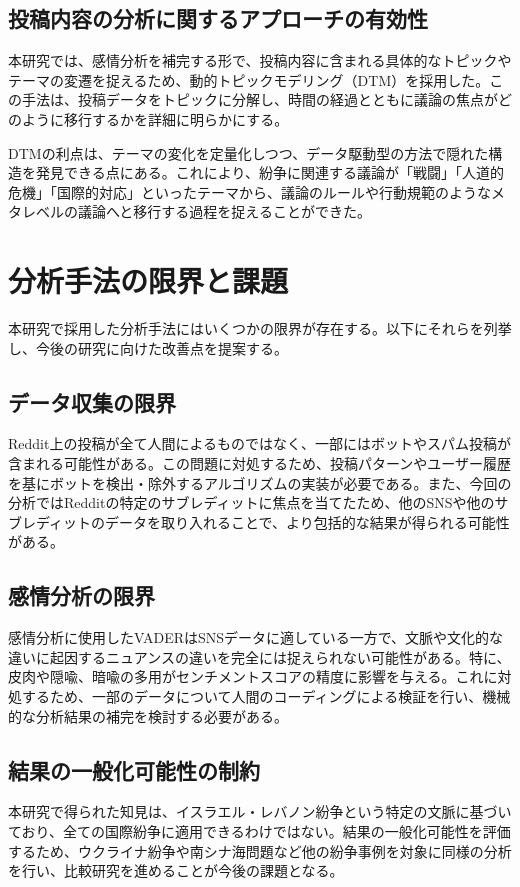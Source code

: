 \documentclass[11pt, a4j]{jreport}
\begin{document}
    \subsection{投稿内容の分析に関するアプローチの有効性}
    本研究では、感情分析を補完する形で、投稿内容に含まれる具体的なトピックやテーマの変遷を捉えるため、動的トピックモデリング（DTM）を採用した。この手法は、投稿データをトピックに分解し、時間の経過とともに議論の焦点がどのように移行するかを詳細に明らかにする。

    DTMの利点は、テーマの変化を定量化しつつ、データ駆動型の方法で隠れた構造を発見できる点にある。これにより、紛争に関連する議論が「戦闘」「人道的危機」「国際的対応」といったテーマから、議論のルールや行動規範のようなメタレベルの議論へと移行する過程を捉えることができた。

    \section{分析手法の限界と課題}
    本研究で採用した分析手法にはいくつかの限界が存在する。以下にそれらを列挙し、今後の研究に向けた改善点を提案する。

    \subsection{データ収集の限界}
    Reddit上の投稿が全て人間によるものではなく、一部にはボットやスパム投稿が含まれる可能性がある。この問題に対処するため、投稿パターンやユーザー履歴を基にボットを検出・除外するアルゴリズムの実装が必要である。また、今回の分析ではRedditの特定のサブレディットに焦点を当てたため、他のSNSや他のサブレディットのデータを取り入れることで、より包括的な結果が得られる可能性がある。

    \subsection{感情分析の限界}
    感情分析に使用したVADERはSNSデータに適している一方で、文脈や文化的な違いに起因するニュアンスの違いを完全には捉えられない可能性がある。特に、皮肉や隠喩、暗喩の多用がセンチメントスコアの精度に影響を与える。これに対処するため、一部のデータについて人間のコーディングによる検証を行い、機械的な分析結果の補完を検討する必要がある。

    \subsection{結果の一般化可能性の制約}
    本研究で得られた知見は、イスラエル・レバノン紛争という特定の文脈に基づいており、全ての国際紛争に適用できるわけではない。結果の一般化可能性を評価するため、ウクライナ紛争や南シナ海問題など他の紛争事例を対象に同様の分析を行い、比較研究を進めることが今後の課題となる。
\end{document}
